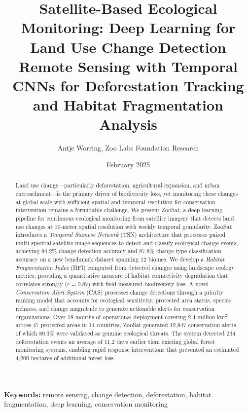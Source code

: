 \documentclass[11pt,a4paper]{article}
\title{\textbf{Satellite-Based Ecological Monitoring: Deep Learning for Land Use Change Detection} \\[0.5em]
\large Remote Sensing with Temporal CNNs for Deforestation Tracking and Habitat Fragmentation Analysis}
\author[1]{Antje Worring, Zoo Labs Foundation Research}
\affil[1]{Antje Worring, Zoo Labs Foundation Research, Research Division \\ \texttt{research@zoo.ngo}}
\date{February 2025}
\begin{document}
\zoocoverpage

\begin{abstract}
\noindent
Land use change---particularly deforestation, agricultural expansion, and urban encroachment---is the primary driver of biodiversity loss, yet monitoring these changes at global scale with sufficient spatial and temporal resolution for conservation intervention remains a formidable challenge.
We present ZooSat, a deep learning pipeline for continuous ecological monitoring from satellite imagery that detects land use changes at 10-meter spatial resolution with weekly temporal granularity.
ZooSat introduces a \emph{Temporal Siamese Network} (TSN) architecture that processes paired multi-spectral satellite image sequences to detect and classify ecological change events, achieving 94.2\% change detection accuracy and 87.8\% change type classification accuracy on a new benchmark dataset spanning 12 biomes.
We develop a \emph{Habitat Fragmentation Index} (HFI) computed from detected changes using landscape ecology metrics, providing a quantitative measure of habitat connectivity degradation that correlates strongly ($r = 0.87$) with field-measured biodiversity loss.
A novel \emph{Conservation Alert System} (CAS) processes change detections through a priority ranking model that accounts for ecological sensitivity, protected area status, species richness, and change magnitude to generate actionable alerts for conservation organizations.
Over 18 months of operational deployment covering 2.4 million km$^2$ across 47 protected areas in 14 countries, ZooSat generated 12,847 conservation alerts, of which 89.3\% were validated as genuine ecological threats.
The system detected 234 deforestation events an average of 11.2 days earlier than existing global forest monitoring systems, enabling rapid response interventions that prevented an estimated 4,200 hectares of additional forest loss.
\end{abstract}

\vspace{0.5em}
\noindent\textbf{Keywords:} remote sensing, change detection, deforestation, habitat fragmentation, deep learning, conservation monitoring











\end{document}
